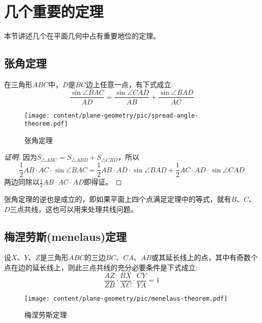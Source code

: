 
\section{几个重要的定理}
\label{sec:some-import-plane-geometry-theorem}

本节讲述几个在平面几何中占有重要地位的定理。

\subsection{张角定理}
\label{sec:spread-angle-theorem}

\begin{theorem}[张角定理]
  在三角形$ABC$中，$D$是$BC$边上任意一点，有下式成立:
  \begin{equation}
    \label{eq:spread-angle-theorem}
    \frac{\sin{\angle{BAC}}}{AD} = \frac{\sin{\angle{CAD}}}{AB} + \frac{\sin{\angle{BAD}}}{AC}
  \end{equation}

  \begin{figure}[htbp]
  \centering
\texttt{[image: content/plane-geometry/pic/spread-angle-theorem.pdf]}
\caption{张角定理}
\label{fig:spread-angle-theorem}
\end{figure}

\end{theorem}

\begin{proof}[证明]
  因为$S_{\triangle ABC} = S_{\triangle ABD} + S_{\triangle CBD}$，所以
  \begin{equation*}
    \frac{1}{2}AB \cdot AC \cdot \sin{\angle BAC} =
    \frac{1}{2}AB \cdot AD \cdot \sin{\angle BAD} +
    \frac{1}{2}AC \cdot AD \cdot \sin{\angle CAD} 
  \end{equation*}
  两边同除以$\frac{1}{2}AB \cdot AC \cdot AD$即得证。
\end{proof}

张角定理的逆也是成立的，即如果平面上四个点满足定理中的等式，就有$B$、$C$、$D$三点共线，这也可以用来处理共线问题。

\subsection{梅涅劳斯(menelaus)定理}
\label{sec:menelaus-theorem}

\begin{theorem}[梅涅劳斯定理]
  设$X$、$Y$、$Z$是三角形$ABC$的三边$BC$、$CA$、$AB$或其延长线上的点，其中有奇数个点在边的延长线上，则此三点共线的充分必要条件是下式成立:
  \begin{equation}
    \label{eq:menelaus-theorem}
    \frac{AZ}{ZB} \cdot \frac{BX}{XC} \cdot \frac{CY}{YA} = 1
 \end{equation}
 
  \begin{figure}[htbp]
  \centering
\texttt{[image: content/plane-geometry/pic/menelaus-theorem.pdf]}
\caption{梅涅劳斯定理}
\label{fig:menelaus-theorem}
\end{figure}

\end{theorem}

